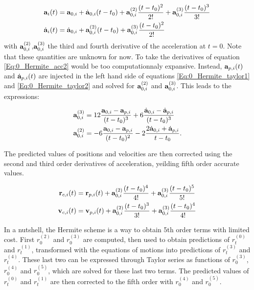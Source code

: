 \begin{align}
\label{Eq:0_Hermite_taylor1}
\bold{a}_{i}(t) &= \bold{a}_{0,i} + \dot{\bold{a}}_{0,i} (t-t_0) + \bold{a}^{(2)}_{0,i}\frac{(t-t_0)^2}{2!} + \bold{a}^{(3)}_{0,i}\frac{(t-t_0)^3}{3!}\\
\label{Eq:0_Hermite_taylor2}
\dot{\bold{a}}_{i}(t) &=  \dot{\bold{a}}_{0,i} +  \bold{a}^{(2)}_{0,i}(t-t_0) + \bold{a}^{(3)}_{0,i}\frac{(t-t_0)^2}{2!}
\end{align}
with $\bold{a}^{(2)}_{0,i}$,$\bold{a}^{(3)}_{0,i}$ the third and fourth derivative of the acceleration at $t=0$. Note that these quantities are unknown for now. To take the derivatives of equation \ref{Eq:0_Hermite_acc2} would be too computationnaly expansive. Instead, $\bold{a}_{p,i}(t)$ and  $\dot{\bold{a}}_{p,i}(t)$ are injected in the left hand side of equations \ref{Eq:0_Hermite_taylor1} and \ref{Eq:0_Hermite_taylor2} and solved for $\bold{a}^{(2)}_{0,i}$ and $\bold{a}^{(3)}_{0,i}$. This leads to the expressions:

\begin{align}
\bold{a}^{(3)}_{0,i} &= 12 \frac{\bold{a}_{0,i} - \bold{a}_{p,i}}{(t-t_0)^3} +6 \frac{\dot{\bold{a}}_{0,i} - \dot{\bold{a}}_{p,i}}{(t-t_0)^3}\\
\bold{a}^{(2)}_{0,i} &= -6 \frac{\bold{a}_{0,i} - \bold{a}_{p,i}}{(t-t_0)^2} - 2 \frac{2\dot{\bold{a}}_{0,i} + \dot{\bold{a}}_{p,i}}{t-t_0}.
\end{align}

The predicted values of positions and velocities are then corrected using the second and third order derivatives of acceleration, yeilding fifth order accurate values.

\begin{align}
\bold{r}_{c,i}(t) &= \bold{r}_{p,i}(t) + \bold{a}^{(2)}_{0,i} \frac{(t-t_0)^4}{4!} +
	 \bold{a}^{(3)}_{0,i} \frac{(t-t_0)^5}{5!}\\
\bold{v}_{c,i}(t) &= \bold{v}_{p,i}(t) + \bold{a}^{(2)}_{0,i} \frac{(t-t_0)^3}{3!} +
	 \bold{a}^{(3)}_{0,i} \frac{(t-t_0)^4}{4!}\\
\end{align}

In a nutshell, the Hermite scheme is a way to obtain 5th order terms with limited cost. First $r_0^{(2)}$ and $r_0^{(3)}$ are computed, then used to obtain predictions of $r_t^{(0)}$ and $r_t^{(1)}$, transformed with the equations of motions into predictions of $r_t^{(3)}$ and $r_t^{(4)}$. These last two can be expressed through Taylor series as functions of $r_0^{(3)}$,$r_0^{(4)}$ and $r_0^{(5)}$, which are solved for these last two terms. The predicted values of $r_t^{(0)}$ and $r_t^{(1)}$ are then corrected to the fifth order with $r_0^{(4)}$ and $r_0^{(5)}$.

